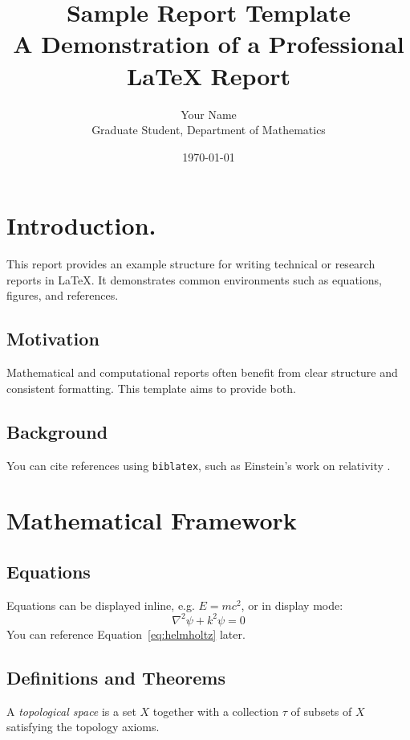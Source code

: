 \documentclass[12pt,a4paper]{report}
\title{%
    \textbf{Sample Report Template}\\[1ex]
    \large A Demonstration of a Professional LaTeX Report
}
\author{Your Name \\ Graduate Student, Department of Mathematics}
\date{\today}
\begin{document}
\maketitle
\tableofcontents
\newpage

\chapter{Introduction.}

This report provides an example structure for writing technical or research reports in \LaTeX. It demonstrates common environments such as equations, figures, and references.

\section{Motivation}
Mathematical and computational reports often benefit from clear structure and consistent formatting. This template aims to provide both.

\section{Background}
You can cite references using \texttt{biblatex}, such as Einstein's work on relativity \cite{einstein1905}.

\chapter{Mathematical Framework}

\section{Equations}
Equations can be displayed inline, e.g. \( E = mc^2 \), or in display mode:
\begin{equation}
    \nabla^2 \psi + k^2 \psi = 0
    \label{eq:helmholtz}
\end{equation}
You can reference Equation~\ref{eq:helmholtz} later.

\section{Definitions and Theorems}

\begin{definition}
A \emph{topological space} is a set \( X \) together with a collection \( \tau \) of subsets of \( X \) satisfying the topology axioms.
\end{definition}
\end{document}
